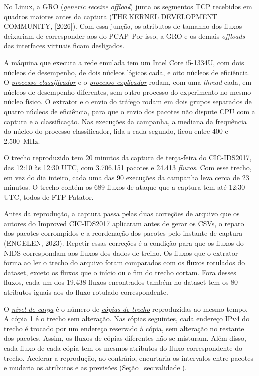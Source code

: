 \documentclass[
  12pt,
  oneside,
  a4paper,
  chapter=TITLE,
  sumario=tradicional,
  english,
  brazil
]{abntex2}
\newcommand{\termo}[2]{\hyperref[gl:#1]{\emph{#2}}}
\begin{document}
No Linux, a GRO (\emph{generic receive offload}) junta os segmentos TCP recebidos em quadros maiores
antes da captura (THE KERNEL DEVELOPMENT COMMUNITY, [2026]). Com essa junção, os atributos de
tamanho dos fluxos deixariam de corresponder aos do PCAP. Por isso, a GRO e os demais
\emph{offloads} das interfaces virtuais ficam desligados.

A máquina que executa a rede emulada tem um Intel Core i5-1334U, com dois núcleos de desempenho, de
dois núcleos lógicos cada, e oito núcleos de eficiência. O
\termo{processo-classificador}{processo classificador} e o
\termo{processo-explicador}{processo explicador} rodam, com uma \emph{thread} cada, em núcleos de
desempenho diferentes, sem outro processo do experimento no mesmo núcleo físico. O extrator e o
envio do tráfego rodam em dois grupos separados de quatro núcleos de eficiência, para que o envio
dos pacotes não dispute CPU com a captura e a classificação. Nas execuções da campanha, a mediana da frequência do núcleo do processo
classificador, lida a cada segundo, ficou entre 400 e 2.500~MHz.

O trecho reproduzido tem 20 minutos da captura de terça-feira do CIC-IDS2017, das 12:10 às 12:30
UTC, com 3.706.151 pacotes e 24.413 \termo{fluxo}{fluxos}. Com esse trecho, em vez do dia inteiro,
cada uma das 90 execuções da campanha leva cerca de 23 minutos. O trecho contém os 689 fluxos de ataque que a captura tem até 12:30 UTC, todos de FTP-Patator.

Antes da reprodução, a captura passa pelas duas correções de arquivo que os autores do Improved
CIC-IDS2017 aplicaram antes de gerar os CSVs, o reparo dos pacotes corrompidos e a reordenação dos
pacotes pelo instante de captura (ENGELEN, 2023). Repetir essas correções é a condição para que os
fluxos do NIDS correspondam aos fluxos dos dados de treino. Os fluxos que o extrator forma ao ler o
trecho do arquivo foram comparados com os fluxos rotulados do dataset, exceto os fluxos que o
início ou o fim do trecho cortam. Fora desses fluxos, cada um dos 19.438 fluxos encontrados também no dataset tem os 80
atributos iguais aos do fluxo rotulado correspondente.

O \termo{nivel-carga}{nível de carga} é o número de \termo{copia}{cópias do trecho} reproduzidas
ao mesmo tempo. A cópia 1 é o trecho sem alteração. Nas cópias seguintes, cada endereço IPv4 do
trecho é trocado por um endereço reservado à cópia, sem alteração no restante dos pacotes. Assim, os
fluxos de cópias diferentes não se misturam. Além disso, cada fluxo de cada cópia tem os mesmos
atributos do fluxo correspondente do trecho. Acelerar a reprodução, ao contrário, encurtaria os
intervalos entre pacotes e mudaria os atributos e as previsões (Seção~\ref{sec:validade}).
\end{document}
